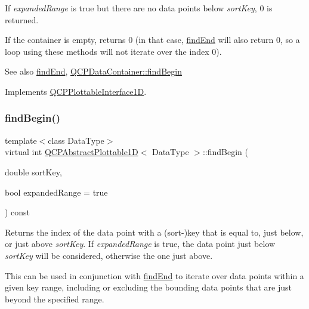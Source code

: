If {\itshape expanded\+Range} is true but there are no data points below {\itshape sort\+Key}, 0 is returned.

If the container is empty, returns 0 (in that case, \hyperlink{class_q_c_p_abstract_plottable1_d_ad913df7f02add35150779dce3913aeae}{find\+End} will also return 0, so a loop using these methods will not iterate over the index 0).

\begin{DoxySeeAlso}{See also}
\hyperlink{class_q_c_p_abstract_plottable1_d_ad913df7f02add35150779dce3913aeae}{find\+End}, \hyperlink{class_q_c_p_data_container_a2ad8a5399072d99a242d3a6d2d7e278a}{Q\+C\+P\+Data\+Container\+::find\+Begin} 
\end{DoxySeeAlso}


Implements \hyperlink{class_q_c_p_plottable_interface1_d_a5b95783271306a4de97be54eac1e7d13}{Q\+C\+P\+Plottable\+Interface1D}.

\mbox{\label{class_q_c_p_abstract_plottable1_d_ae8206cf770f180e01d0a02e998d4e788}} 
\subsubsection{\texorpdfstring{find\+Begin()}{findBegin()}\hspace{0.1cm}{\footnotesize\ttfamily [2/2]}}
{\footnotesize\ttfamily template$<$class Data\+Type$>$ \\
virtual int \hyperlink{class_q_c_p_abstract_plottable1_d}{Q\+C\+P\+Abstract\+Plottable1D}$<$ Data\+Type $>$\+::find\+Begin (\begin{DoxyParamCaption}\item[{double}]{sort\+Key,  }\item[{bool}]{expanded\+Range = {\ttfamily true} }\end{DoxyParamCaption}) const\hspace{0.3cm}{\ttfamily [virtual]}}

Returns the index of the data point with a (sort-\/)key that is equal to, just below, or just above {\itshape sort\+Key}. If {\itshape expanded\+Range} is true, the data point just below {\itshape sort\+Key} will be considered, otherwise the one just above.

This can be used in conjunction with \hyperlink{class_q_c_p_abstract_plottable1_d_ad913df7f02add35150779dce3913aeae}{find\+End} to iterate over data points within a given key range, including or excluding the bounding data points that are just beyond the specified range.

